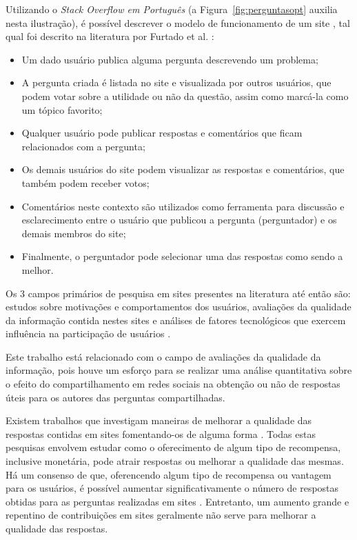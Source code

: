 Utilizando o \textit{Stack Overflow em Português} (a Figura~\ref{fig:perguntasopt} auxilia nesta ilustração), é possível descrever o modelo de funcionamento de um site \qa, tal qual foi descrito na literatura por Furtado et al. \cite{furtado2013contributor}:
    \begin{itemize}
        \item Um dado usuário publica alguma pergunta descrevendo um problema;
        \item A pergunta criada é listada no site e visualizada por outros usuários, que podem votar sobre a utilidade ou não da questão, assim como marcá-la como um tópico favorito;
        \item Qualquer usuário pode publicar respostas e comentários que ficam relacionados com a pergunta;
        \item Os demais usuários do site podem visualizar as respostas e comentários, que também podem receber votos;
        \item Comentários neste contexto são utilizados como ferramenta para discussão e esclarecimento entre o usuário que publicou a pergunta (perguntador) e os demais membros do site;
        \item Finalmente, o perguntador pode selecionar uma das respostas como sendo a melhor.
    \end{itemize}
    
Os 3 campos primários de pesquisa em sites \qa presentes na literatura até então são: estudos sobre motivações e comportamentos dos usuários, avaliações da qualidade da informação contida nestes sites e análises de fatores tecnológicos que exercem influência na participação de usuários \cite{shah2009research}.

Este trabalho está relacionado com o campo de avaliações da qualidade da informação, pois houve um esforço para se realizar uma análise quantitativa sobre o efeito do compartilhamento em redes sociais na obtenção ou não de respostas úteis para os autores das perguntas compartilhadas.

Existem trabalhos que investigam maneiras de melhorar a qualidade das respostas contidas em sites \qa fomentando-os de alguma forma \cite{harper2008predictors,chen2010knowledge,jeon2010re}. Todas estas pesquisas envolvem estudar como o oferecimento de algum tipo de recompensa, inclusive monetária, pode atrair respostas ou melhorar a qualidade das mesmas. Há um consenso de que, oferencendo algum tipo de recompensa ou vantagem para os usuários, é possível aumentar significativamente o número de respostas obtidas para as perguntas realizadas em sites \qanospace. Entretanto, um aumento grande e repentino de contribuições em sites \qa geralmente não serve para melhorar a qualidade das respostas.

